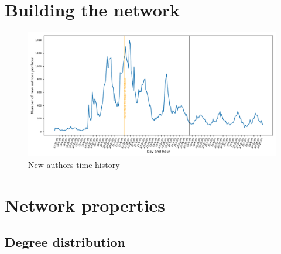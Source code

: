 \documentclass[12pt, twoside]{report}
\begin{document}
    \chapter{Building the network}

    \begin{figure}[htbp]
      \centering
\includegraphics[width=\textwidth]{../../scripts/network_analysis/imgs/time_history.pdf}
      \caption{New authors time history}
      \label{fig:time_history}
    \end{figure}


    \chapter{Network properties}

 \section{Degree distribution}    


  
 
\end{document}
